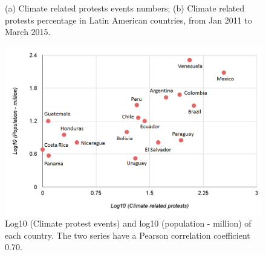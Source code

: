 \begin{figure}[t]
	\centering
	\caption{(a) Climate related protests events numbers; (b) Climate related protests percentage in Latin American countries, from Jan 2011 to March 2015. }
\label{map}
\end{figure}



\begin{figure}[ht]
\centerline
{\includegraphics[width=.8\textwidth]{figures/protest-population}}
\caption{Log10 (Climate protest events) and log10 (population - million) of each country. The two series have a Pearson correlation coefficient 0.70.}
\label{protest-population}
\end{figure}

